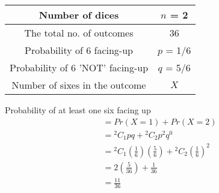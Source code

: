  \begin{table}[ht]
  \centering
  \begin{tabular}{|c|c|}
        \hline
         Number of dices & \(n\) = 2\\
         \hline
         The total no. of outcomes & 36\\ 
        \hline
         Probability of 6 facing-up & \(p\) = 1/6 \\
        \hline
         Probability of 6 'NOT' facing-up & \(q\) = 5/6 \\
        \hline
         Number of sixes in the outcome & \(X\) \\ 
        \hline
    \end{tabular}
\end{table}
Probability of at least one six facing up
    \begin{align}
         & = {Pr(X = 1)} + {Pr(X = 2)} \\
         & = {^2 C _1}{p}{q} + {^2 C _2}{p^2}{q^0}\\
         & = {^2 C _1} \left( {\frac{1}{6}}\right) \left( {\frac{5}{6}}\right) + {^2 C _2} \left(\frac{1}{6}\right) ^2\\ 
         & = 2 \left(\frac{5}{36}\right) + \frac{1}{36}\\
         & = \frac{11}{36}
    \end{align}
